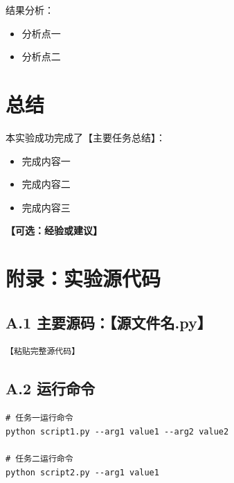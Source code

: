 \documentclass[12pt,a4paper]{ctexart}
\begin{document}
结果分析：
\begin{itemize}
  \item 分析点一
  \item 分析点二
\end{itemize}

\section{总结}
本实验成功完成了【主要任务总结】：
\begin{itemize}
  \item 完成内容一
  \item 完成内容二
  \item 完成内容三
\end{itemize}

\textbf{【可选：经验或建议】}

\section*{附录：实验源代码}
\subsection*{A.1 主要源码：【源文件名.py】}
\begin{lstlisting}
【粘贴完整源代码】
\end{lstlisting}

\subsection*{A.2 运行命令}
\begin{verbatim}
# 任务一运行命令
python script1.py --arg1 value1 --arg2 value2

# 任务二运行命令
python script2.py --arg1 value1
\end{verbatim}
\end{document}
